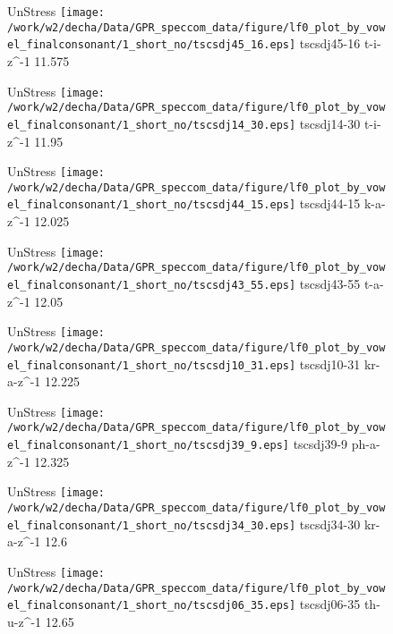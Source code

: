 \documentclass{article}
\begin{document}
\begin{figure}[t]
\begin{minipage}[b]{.24\textwidth}
UnStress
\centering
\texttt{[image: /work/w2/decha/Data/GPR\_speccom\_data/figure/lf0\_plot\_by\_vowel\_finalconsonant/1\_short\_no/tscsdj45\_16.eps]}
tscsdj45-16 t-i-z\textasciicircum-1 11.575
\end{minipage}
\begin{minipage}[b]{.24\textwidth}
UnStress
\centering
\texttt{[image: /work/w2/decha/Data/GPR\_speccom\_data/figure/lf0\_plot\_by\_vowel\_finalconsonant/1\_short\_no/tscsdj14\_30.eps]}
tscsdj14-30 t-i-z\textasciicircum-1 11.95
\end{minipage}
\begin{minipage}[b]{.24\textwidth}
UnStress
\centering
\texttt{[image: /work/w2/decha/Data/GPR\_speccom\_data/figure/lf0\_plot\_by\_vowel\_finalconsonant/1\_short\_no/tscsdj44\_15.eps]}
tscsdj44-15 k-a-z\textasciicircum-1 12.025
\end{minipage}
\begin{minipage}[b]{.24\textwidth}
UnStress
\centering
\texttt{[image: /work/w2/decha/Data/GPR\_speccom\_data/figure/lf0\_plot\_by\_vowel\_finalconsonant/1\_short\_no/tscsdj43\_55.eps]}
tscsdj43-55 t-a-z\textasciicircum-1 12.05
\end{minipage}
\end{figure}
\clearpage
\begin{figure}[t]
\begin{minipage}[b]{.24\textwidth}
UnStress
\centering
\texttt{[image: /work/w2/decha/Data/GPR\_speccom\_data/figure/lf0\_plot\_by\_vowel\_finalconsonant/1\_short\_no/tscsdj10\_31.eps]}
tscsdj10-31 kr-a-z\textasciicircum-1 12.225
\end{minipage}
\begin{minipage}[b]{.24\textwidth}
UnStress
\centering
\texttt{[image: /work/w2/decha/Data/GPR\_speccom\_data/figure/lf0\_plot\_by\_vowel\_finalconsonant/1\_short\_no/tscsdj39\_9.eps]}
tscsdj39-9 ph-a-z\textasciicircum-1 12.325
\end{minipage}
\begin{minipage}[b]{.24\textwidth}
UnStress
\centering
\texttt{[image: /work/w2/decha/Data/GPR\_speccom\_data/figure/lf0\_plot\_by\_vowel\_finalconsonant/1\_short\_no/tscsdj34\_30.eps]}
tscsdj34-30 kr-a-z\textasciicircum-1 12.6
\end{minipage}
\begin{minipage}[b]{.24\textwidth}
UnStress
\centering
\texttt{[image: /work/w2/decha/Data/GPR\_speccom\_data/figure/lf0\_plot\_by\_vowel\_finalconsonant/1\_short\_no/tscsdj06\_35.eps]}
tscsdj06-35 th-u-z\textasciicircum-1 12.65
\end{minipage}
\end{figure}
\end{document}

